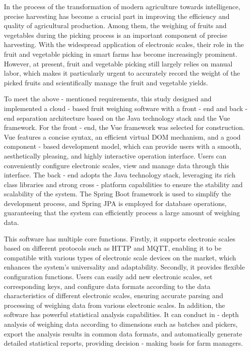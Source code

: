 In the process of the transformation of modern agriculture towards intelligence, precise harvesting has become a crucial part in improving the efficiency and quality of agricultural production. Among them, the weighing of fruits and vegetables during the picking process is an important component of precise harvesting. With the widespread application of electronic scales, their role in the fruit and vegetable picking in smart farms has become increasingly prominent. However, at present, fruit and vegetable picking still largely relies on manual labor, which makes it particularly urgent to accurately record the weight of the picked fruits and scientifically manage the fruit and vegetable yields.

To meet the above - mentioned requirements, this study designed and implemented a cloud - based fruit weighing software with a front - end and back - end separation architecture based on the Java technology stack and the Vue framework. For the front - end, the Vue framework was selected for construction. Vue features a concise syntax, an efficient virtual DOM mechanism, and a good component - based development model, which can provide users with a smooth, aesthetically pleasing, and highly interactive operation interface. Users can conveniently configure electronic scales, view and manage data through this interface. The back - end adopts the Java technology stack, leveraging its rich class libraries and strong cross - platform capabilities to ensure the stability and scalability of the system. The Spring Boot framework is used to simplify the development process, and Spring JPA is employed for database operations, guaranteeing that the system can efficiently process a large amount of weighing data.

This software has multiple core functions. Firstly, it supports electronic scales based on different protocols such as HTTP and MQTT, enabling it to be compatible with various types of electronic scale devices on the market, which enhances the system's universality and adaptability. Secondly, it provides flexible configuration functions. Users can easily add new electronic scales, set corresponding keys, and configure data formats according to the data characteristics of different electronic scales, ensuring accurate parsing and processing of weighing data from various electronic scales. In addition, the software has powerful statistical analysis capabilities. It can conduct in - depth analysis of weighing data according to dimensions such as batches and pickers, export the analysis results in common data formats, and automatically generate detailed statistical reports, providing decision - making basis for farm managers.

